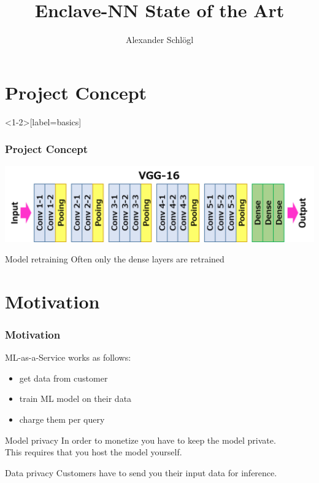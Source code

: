 \documentclass[aspectratio=169,nototalframenumber]{beamer}
\title{Enclave-NN State of the Art}
\author{Alexander Schl\"ogl}
\begin{document}
\uibktitlepage{}

\section{Project Concept}
\begin{frame}<1-2>[label=basics]
  \frametitle{Project Concept}
  \begin{center}
    \includegraphics[width=\textwidth]{vgg16.png}
  \end{center}
  
  \pause
  \begin{block}{Model retraining}
    Often only the dense layers are retrained
  \end{block}
  \pause
  
\end{frame}

\section{Motivation}
\begin{frame}
  \frametitle{Motivation}

  ML-as-a-Service works as follows:
  \begin{itemize}
  \item get data from customer
  \item train ML model on their data
  \item charge them per query
  \end{itemize}
  \medskip
  \pause
  \begin{block}{Model privacy}
    In order to monetize you have to keep the model private.\\ 
    This requires that you host the model yourself.
  \end{block}
  \medskip
  \pause
  \begin{block}{Data privacy}
    Customers have to send you their input data for inference.
  \end{block}
\end{frame}
\end{document}
